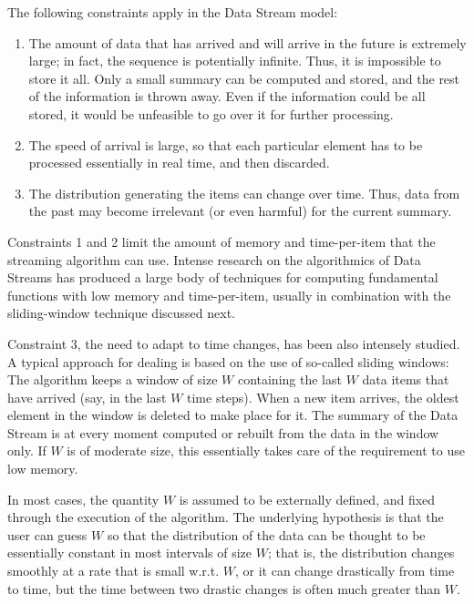 The following constraints apply in the Data Stream model:
\begin{enumerate}
\item  The amount of data that has arrived and will arrive in the future is extremely large; in fact, the sequence is potentially infinite. Thus, it is impossible to store it all. Only a small summary can be computed and stored, and the rest of the information is thrown away. Even if the information could be all stored, it would be unfeasible to go over it for further processing.
\item The speed of arrival is large, so that each particular element has to be processed essentially in real time, and then discarded.
\item The distribution generating the items can change over time. Thus, data from the past may become irrelevant (or even harmful) for the current summary.
\end{enumerate}

Constraints 1 and 2 limit the amount of memory and time-per-item that the streaming algorithm can use. Intense research on the algorithmics of Data Streams has produced a large body of techniques for computing fundamental functions with low memory and time-per-item, usually in combination with the sliding-window technique discussed next.

Constraint 3, the need to adapt to time changes, has been also intensely studied. A typical approach for dealing is based on the use of so-called sliding windows: The algorithm keeps a window of size $W$ containing the last $W$ data items that have arrived (say, in the last $W$ time steps). When a new item arrives, the oldest element in the window is deleted to make place for it. The summary of the Data Stream is at every moment computed or rebuilt from the data in the window only. If $W$ is of moderate size, this essentially takes care of the requirement to use low memory. 

In most cases, the quantity $W$ is assumed to be externally defined, and fixed through
the execution of the algorithm. The underlying hypothesis is that the user can guess $W$ so that the
distribution of the data can be thought to be essentially constant in most intervals of size $W$; that
is, the distribution changes smoothly at a rate that is small w.r.t. $W$, or it can change drastically
from time to time, but the time between two drastic changes is often much greater than $W$.


